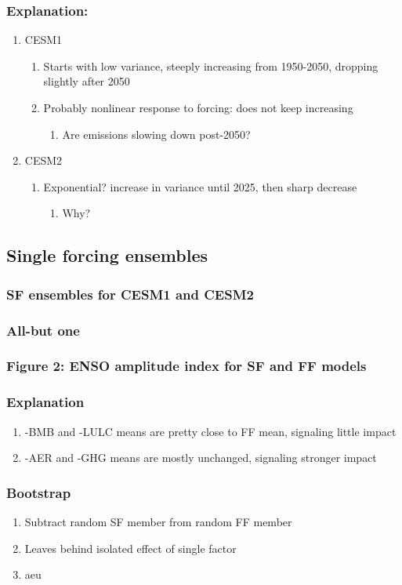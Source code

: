 \documentclass[11pt]{article}
\begin{document}
\subsubsection{Explanation:}
\label{sec:org1c938fa}
\begin{enumerate}
\item CESM1
\label{sec:org20d12a8}
\begin{enumerate}
\item Starts with low variance, steeply increasing from 1950-2050, dropping slightly after 2050
\label{sec:orga9e35ea}
\item Probably nonlinear response to forcing: does not keep increasing
\label{sec:org97cb690}
\begin{enumerate}
\item Are emissions slowing down post-2050?
\label{sec:org42ff186}
\end{enumerate}
\end{enumerate}
\item CESM2
\label{sec:org5378e06}
\begin{enumerate}
\item Exponential? increase in variance until 2025, then sharp decrease
\label{sec:org3dea794}
\begin{enumerate}
\item Why?
\label{sec:org487e458}
\end{enumerate}
\end{enumerate}
\end{enumerate}
\subsection{Single forcing ensembles}
\label{sec:org85701d9}
\subsubsection{SF ensembles for CESM1 and CESM2}
\label{sec:org863b2ac}
\subsubsection{All-but one}
\label{sec:org55682bb}
\subsubsection{Figure 2: ENSO amplitude index for SF and FF models}
\label{sec:org9520816}
\subsubsection{Explanation}
\label{sec:orge8bf1b3}
\begin{enumerate}
\item -BMB and -LULC means are pretty close to FF mean, signaling little impact
\label{sec:orge62b262}
\item -AER and -GHG means are mostly unchanged, signaling stronger impact
\label{sec:org778cb4f}
\end{enumerate}
\subsubsection{Bootstrap}
\label{sec:org4a237e8}
\begin{enumerate}
\item Subtract random SF member from random FF member
\label{sec:org54d0446}
\item Leaves behind isolated effect of single factor
\label{sec:orgf1b88f4}
\item aeu
\label{sec:orgbab39ac}
\end{enumerate}
\end{document}
